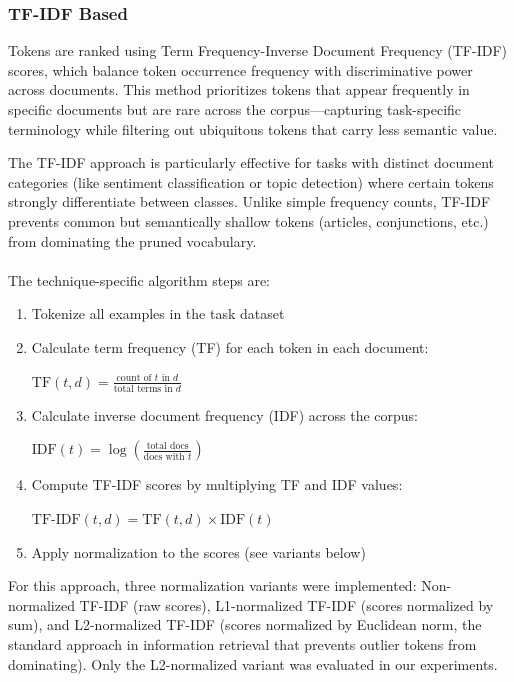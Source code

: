 \documentclass[twocolumn]{article}
\begin{document}
\subsubsection{TF-IDF Based}
Tokens are ranked using Term Frequency-Inverse Document Frequency (TF-IDF) scores, which balance token occurrence frequency with discriminative power across documents. This method prioritizes tokens that appear frequently in specific documents but are rare across the corpus—capturing task-specific terminology while filtering out ubiquitous tokens that carry less semantic value.

The TF-IDF approach is particularly effective for tasks with distinct document categories (like sentiment classification or topic detection) where certain tokens strongly differentiate between classes. Unlike simple frequency counts, TF-IDF prevents common but semantically shallow tokens (articles, conjunctions, etc.) from dominating the pruned vocabulary.
\\ \\
The technique-specific algorithm steps are:
\begin{enumerate}
    \item Tokenize all examples in the task dataset
    \item Calculate term frequency (TF) for each token in each document:
        \begin{center}
        $\text{TF}(t,d) = \frac{\text{count of $t$ in $d$}}{\text{total terms in $d$}}$
        \end{center}
    \item Calculate inverse document frequency (IDF) across the corpus:
        \begin{center}
        $\text{IDF}(t) = \log\left(\frac{\text{total docs}}{\text{docs with $t$}}\right)$
        \end{center}
    \item Compute TF-IDF scores by multiplying TF and IDF values:
        \begin{center}
        $\text{TF-IDF}(t,d) = \text{TF}(t,d) \times \text{IDF}(t)$
        \end{center}
    \item Apply normalization to the scores (see variants below)
\end{enumerate}
For this approach, three normalization variants were implemented: Non-normalized TF-IDF (raw scores), L1-normalized TF-IDF (scores normalized by sum), and L2-normalized TF-IDF (scores normalized by Euclidean norm, the standard approach in information retrieval that prevents outlier tokens from dominating). Only the L2-normalized variant was evaluated in our experiments.
\end{document}
